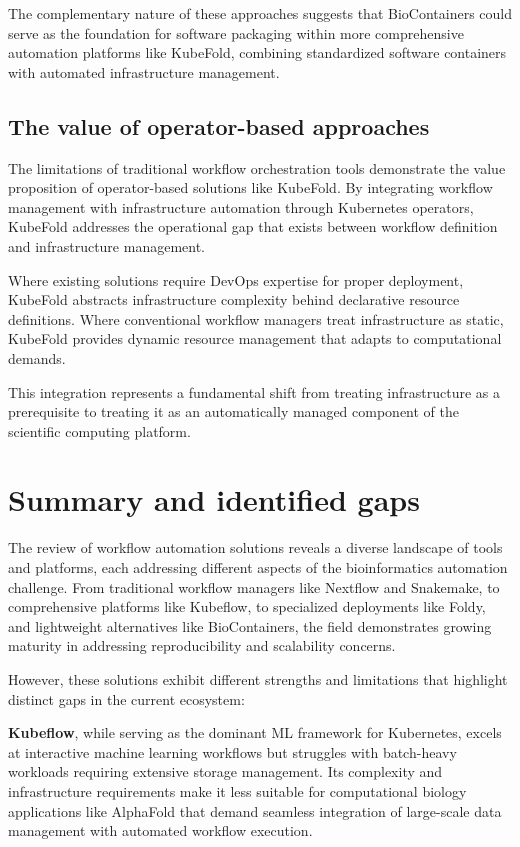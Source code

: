 The complementary nature of these approaches suggests that BioContainers could serve as the foundation for software packaging within more comprehensive automation platforms like KubeFold, combining standardized software containers with automated infrastructure management.

\subsection{The value of operator-based approaches}

The limitations of traditional workflow orchestration tools demonstrate the value proposition of operator-based solutions like KubeFold.
By integrating workflow management with infrastructure automation through Kubernetes operators, KubeFold addresses the operational gap that exists between workflow definition and infrastructure management.

Where existing solutions require DevOps expertise for proper deployment, KubeFold abstracts infrastructure complexity behind declarative resource definitions.
Where conventional workflow managers treat infrastructure as static, KubeFold provides dynamic resource management that adapts to computational demands.

This integration represents a fundamental shift from treating infrastructure as a prerequisite to treating it as an automatically managed component of the scientific computing platform.

\section{Summary and identified gaps}

The review of workflow automation solutions reveals a diverse landscape of tools and platforms, each addressing different aspects of the bioinformatics automation challenge.
From traditional workflow managers like Nextflow and Snakemake, to comprehensive platforms like Kubeflow, to specialized deployments like Foldy, and lightweight alternatives like BioContainers, the field demonstrates growing maturity in addressing reproducibility and scalability concerns.

However, these solutions exhibit different strengths and limitations that highlight distinct gaps in the current ecosystem:

\textbf{Kubeflow}, while serving as the dominant ML framework for Kubernetes, excels at interactive machine learning workflows but struggles with batch-heavy workloads requiring extensive storage management.
Its complexity and infrastructure requirements make it less suitable for computational biology applications like AlphaFold that demand seamless integration of large-scale data management with automated workflow execution.

